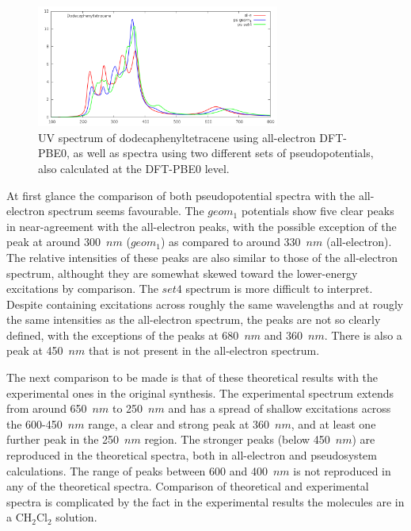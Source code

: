 \documentclass[aip,reprint,nofootinbib]{revtex4-1}
\begin{document}
\begin{figure}
\begin{center}
\includegraphics[width=8cm]{dodecaphenyltetracene_rpas.png}
\end{center}
\label{fig:dodecaphenyltetracene_spectra}
\caption[Dodecaphenyltetracene spectra: All-electron and pseudopotentials.]{UV spectrum of dodecaphenyltetracene using all-electron DFT-PBE0, as well as spectra using two different sets of pseudopotentials, also calculated at the DFT-PBE0 level.}
\end{figure}

At first glance the comparison of both pseudopotential spectra with the all-electron spectrum seems favourable. The $geom_1$ potentials show five clear peaks in near-agreement with the all-electron peaks, with the possible exception of the peak at around 300~$nm$ ($geom_1$) as compared to around 330~$nm$ (all-electron). The relative intensities of these peaks are also similar to those of the all-electron spectrum, althought they are somewhat skewed toward the lower-energy excitations by comparison. The $set4$ spectrum is more difficult to interpret. Despite containing excitations across roughly the same wavelengths and at rougly the same intensities as the all-electron spectrum, the peaks are not so clearly defined, with the exceptions of the peaks at 680~$nm$ and 360~$nm$. There is also a peak at 450~$nm$ that is not present in the all-electron spectrum.

The next comparison to be made is that of these theoretical results with the experimental ones in the original synthesis. The experimental spectrum extends from around 650~$nm$ to 250~$nm$ and has a spread of shallow excitations across the 600-450~$nm$ range, a clear and strong peak at 360~$nm$, and at least one further peak in the 250~$nm$ region. The stronger peaks (below 450~$nm$) are reproduced in the theoretical spectra, both in all-electron and pseudosystem calculations. The range of peaks between 600 and 400~$nm$ is not reproduced in any of the theoretical spectra. Comparison of theoretical and experimental spectra is complicated by the fact in the experimental results the molecules are in a CH$_2$Cl$_2$ solution.
\end{document}
